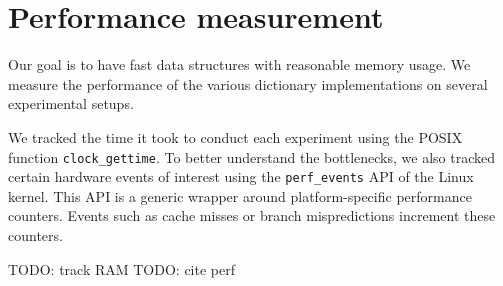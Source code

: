 \section{Performance measurement}

Our goal is to have fast data structures with reasonable memory usage.
We measure the performance of the various dictionary implementations
on several experimental setups.

We tracked the time it took to conduct each experiment using the POSIX function
\texttt{clock\_gettime}. To better understand the bottlenecks, we also
tracked certain hardware events of interest using the \texttt{perf\_events} API
of the Linux kernel. This API is a generic wrapper around platform-specific
performance counters. Events such as cache misses or branch mispredictions
increment these counters.

TODO: track RAM
TODO: cite perf

